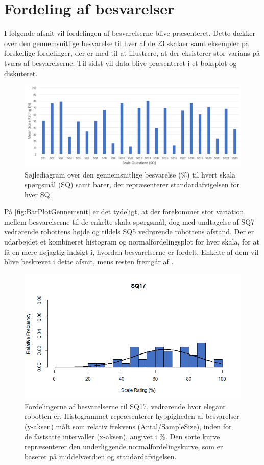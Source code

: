 \section{Fordeling af besvarelser}
\label{TestAfSkalaFordeling}
%
I følgende afsnit vil fordelingen af besvarelserne blive præsenteret. Dette dækker over den gennemsnitlige besvarelse til hver af de 23 skalaer samt eksempler på forskellige fordelinger, der er med til at illustrere, at der eksisterer stor varians på tværs af besvarelserne. Til sidst vil data blive præsenteret i et boksplot og diskuteret.
%
\begin{figure}[H]
\centering
\includegraphics[width = \textwidth]{Figure/DatabehandlingSkalaer/DataPresentation/MeanBarplot} 
 \caption{Søjlediagram over den gennemsnitlige besvarelse (\%) til hvert skala spørgsmål (SQ) samt barer, der repræsenterer standardafvigelsen for hver SQ.}
\label{fig:BarPlotGennemsnit}
\end{figure}
\noindent
%
På \autoref{fig:BarPlotGennemsnit} er det tydeligt, at der forekommer stor variation mellem besvarelserne til de enkelte skala spørgsmål, dog med undtagelse af SQ7 vedrørende robottens højde og tildels SQ5 vedrørende robottens afstand. Der er udarbejdet et kombineret histogram og normalfordelingsplot for hver skala, for at få en mere nøjagtig indsigt i, hvordan besvarelserne er fordelt. Enkelte af dem vil blive beskrevet i dette afsnit, mens resten fremgår af .
%
\begin{figure}[H]
\centering
\includegraphics[width = \textwidth]{Figure/DatabehandlingSkalaer/HistogramNormalFordeling/SQ17} 
\caption{Fordelingerne af besvarelserne til SQ17, vedrørende hvor elegant robotten er. Histogrammet repræsenterer hyppigheden af besvarelser (y-aksen) målt som relativ frekvens (Antal/SampleSize), inden for de fastsatte intervaller (x-aksen), angivet i \%. Den sorte kurve repræsenterer den underliggende normalfordelingskurve, som er baseret på middelværdien og standardafvigelsen.}
\label{fig:Histogram17}
\end{figure}
